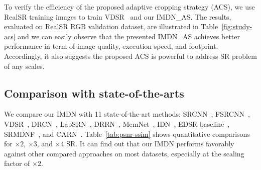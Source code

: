 \documentclass[sigconf]{acmart}
\begin{document}
To verify the efficiency of the proposed adaptive cropping strategy (ACS), we use RealSR training images to train VDSR~\cite{VDSR} and our IMDN\_AS. The results, evaluated on RealSR RGB validation dataset, are illustrated in Table~\ref{fig:study-acs} and we can easily observe that the presented IMDN\_AS achieves better performance in term of image quality, execution speed, and footprint. Accordingly, it also suggests the proposed ACS is powerful to address SR problem of any scales.

\subsection{Comparison with state-of-the-arts}
We compare our IMDN with 11 state-of-the-art methods: SRCNN~\cite{SRCNN,SRCNN-Ex}, FSRCNN~\cite{FSRCNN}, VDSR~\cite{VDSR}, DRCN~\cite{DRCN}, LapSRN~\cite{LapSRN}, DRRN~\cite{DRRN}, MemNet~\cite{MemNet}, IDN~\cite{IDN}, EDSR-baseline~\cite{EDSR}, SRMDNF~\cite{SRMDNF}, and CARN~\cite{CARN}. Table~\ref{tab:psnr-ssim} shows quantitative comparisons for $\times 2$, $\times 3$, and $\times4$ SR. It can find out that our IMDN performs favorably against other compared approaches on most datasets, especially at the scaling factor of $\times 2$. 
\end{document}
